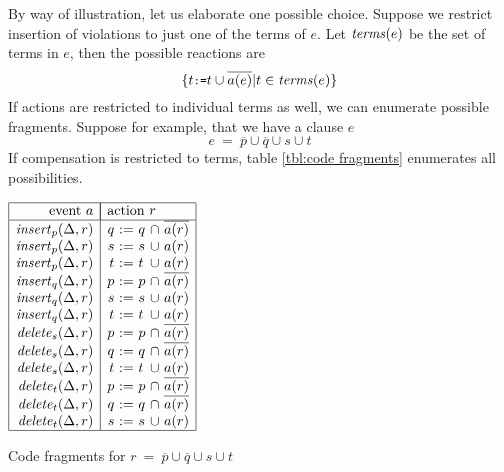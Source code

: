 \documentclass[11pt,a4paper,fleqn,oneside]{article}
\newcommand{\code}[1]{\text{\tt\small #1}}
\def\id#1{\text{\em #1\/}}
\newcommand{\cmpl}[1]{\overline{#1}}
\begin{document}
	By way of illustration, let us elaborate one possible choice.
	Suppose we restrict insertion of violations to just one of the terms of $e$.
	Let $\id{terms}(e)$ be the set of terms in $e$,
	then the possible reactions are
\[\{t\code{:=}t\cup\cmpl{a(e)} | t\in\id{terms}(e)\}\]
	If actions are restricted to individual terms as well,
	we can enumerate possible fragments.
	Suppose for example, that we have a clause $e$
\[e\ =\ \cmpl{p}\cup\cmpl{q}\cup s\cup t\]
	If compensation is restricted to terms, table \ref{tbl:code fragments} enumerates all possibilities.
\begin{table}[ht]
\begin{center}
\(\begin{array}{|r|r@{~\tt :=~}l@{~}c@{~}c|}
\hline
\text{event $a$}&\multicolumn{4}{|l|}{\text{action $r$}}\\\hline
\id{insert}_p(\Delta,r)&q&q&\cap&\cmpl{a(r)}\\
\id{insert}_p(\Delta,r)&s&s&\cup&a(r)\\
\id{insert}_p(\Delta,r)&t&t&\cup&a(r)\\
\id{insert}_q(\Delta,r)&p&p&\cap&\cmpl{a(r)}\\
\id{insert}_q(\Delta,r)&s&s&\cup&a(r)\\
\id{insert}_q(\Delta,r)&t&t&\cup&a(r)\\
\id{delete}_s(\Delta,r)&p&p&\cap&\cmpl{a(r)}\\
\id{delete}_s(\Delta,r)&q&q&\cap&\cmpl{a(r)}\\
\id{delete}_s(\Delta,r)&t&t&\cup&a(r)\\
\id{delete}_t(\Delta,r)&p&p&\cap&\cmpl{a(r)}\\
\id{delete}_t(\Delta,r)&q&q&\cap&\cmpl{a(r)}\\
\id{delete}_t(\Delta,r)&s&s&\cup&a(r)\\
\hline
\end{array}\)
\end{center}
\caption{Code fragments for $r\ =\ \cmpl{p}\cup\cmpl{q}\cup s\cup t$}
\label{tbl:code fragments}
\end{table} 
	
\end{document}
